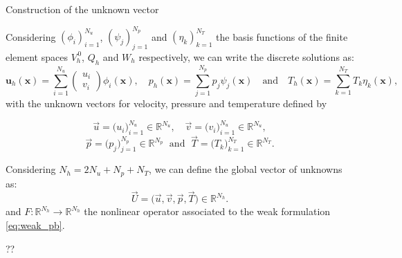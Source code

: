 
\begin{appendixframe}{Construction of the unknown vector}

	Considering $(\phi_i)_{i=1}^{N_u}$, $(\psi_j)_{j=1}^{N_p}$ and $(\eta_k)_{k=1}^{N_T}$ the basis functions of the finite element spaces $V_h^{\, 0}$, $Q_h$ and $W_h$ respectively, we can write the discrete solutions as:
	\begin{equation*}
		\bm{u}_h(\bm{x}) = \sum_{i=1}^{N_u} \begin{pmatrix}
			u_i \\
			v_i
		\end{pmatrix} \phi_i(\bm{x}), \quad p_h(\bm{x}) = \sum_{j=1}^{N_p} p_j \psi_j(\bm{x}) \quad \text{and} \quad T_h(\bm{x}) = \sum_{k=1}^{N_T} T_k \eta_k(\bm{x}),
	\end{equation*}	
	with the unknown vectors for velocity, pressure and temperature defined by

	\vspace{-5pt}
	$$\vec{u} = \big(u_i\big)_{i=1}^{N_u} \in \mathbb{R}^{N_u}, \quad \vec{v} = \big(v_i\big)_{i=1}^{N_u} \in \mathbb{R}^{N_u},$$
	$$\vec{p} = \big(p_j\big)_{j=1}^{N_p} \in \mathbb{R}^{N_p} \; \text{ and } \; \vec{T} = \big(T_k\big)_{k=1}^{N_T} \in \mathbb{R}^{N_T}.$$

	\vspace{5pt}
	Considering $N_h = 2N_u + N_p + N_T$, we can define the global vector of unknowns as:
	\begin{equation*}
		\vec{U} = \big(\vec{u}, \vec{v}, \vec{p}, \vec{T}) \in \mathbb{R}^{N_h}.
	\end{equation*}
	and $F:\mathbb{R}^{N_h} \to \mathbb{R}^{N_h}$ the nonlinear operator associated to the weak formulation \eqref{eq:weak_pb}.
\end{appendixframe}



\begin{appendixframe}{??}

\end{appendixframe}